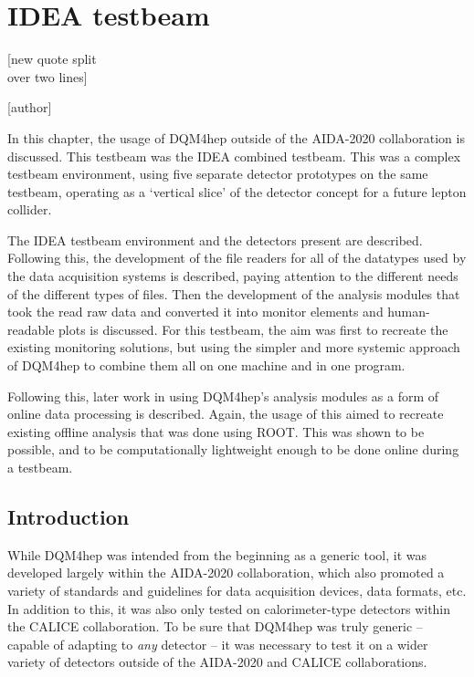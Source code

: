 
\chapter{\acrshort{IDEA} testbeam}
\label{chapter:ideatestbeam}

\epigraph{[new quote split \\ over two lines]}{[author]}

In this chapter, the usage of \acrshort{DQM4hep} outside of the \acrshort{AIDA}-2020 collaboration is discussed. This testbeam was the \acrfull{IDEA} combined testbeam. This was a complex testbeam environment, using five separate detector prototypes on the same testbeam, operating as a `vertical slice' of the detector concept for a future lepton collider.

The \acrshort{IDEA} testbeam environment and the detectors present are described. Following this, the development of the file readers for all of the datatypes used by the data acquisition systems is described, paying attention to the different needs of the different types of files. Then the development of the analysis modules that took the read raw data and converted it into monitor elements and human-readable plots is discussed. For this testbeam, the aim was first to recreate the existing monitoring solutions, but using the simpler and more systemic approach of \acrshort{DQM4hep} to combine them all on one machine and in one program. 

Following this, later work in using \acrshort{DQM4hep}'s analysis modules as a form of online data processing is described. Again, the usage of this aimed to recreate existing offline analysis that was done using ROOT. This was shown to be possible, and to be computationally lightweight enough to be done online during a testbeam.

\section{Introduction}
While \acrshort{DQM4hep} was intended from the beginning as a generic tool, it was developed largely within the \acrshort{AIDA}-2020 collaboration, which also promoted a variety of standards and guidelines for data acquisition devices, data formats, etc. In addition to this, it was also only tested on calorimeter-type detectors within the \acrshort{CALICE} collaboration. To be sure that \acrshort{DQM4hep} was truly generic -- capable of adapting to \textit{any} detector -- it was necessary to test it on a wider variety of detectors outside of the \acrshort{AIDA}-2020 and \acrshort{CALICE} collaborations.


